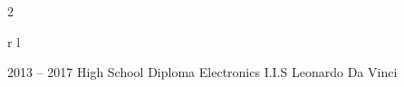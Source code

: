 \documentclass[
	10pt, %
]{FreemanCV}
\begin{document}
\begin{paracol}{2}
\begin{supertabular}{r l}
	
	\qualificationentry
		{2013 -- 2017} %
		{High School Diploma} %
        {Electronics} %
        {I.I.S Leonardo Da Vinci} %
		{} %
	      {}

\end{supertabular}









	
	
	
	
	

\end{paracol}
\end{document}
